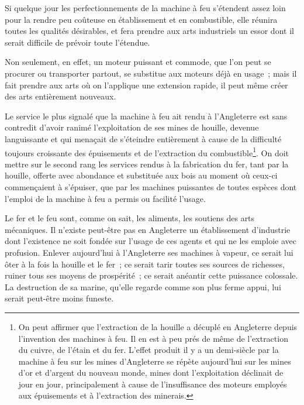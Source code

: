 \documentclass[french,twoside]{book} %
\begin{document}
Si quelque jour les perfectionnements de la machine à feu s’étendent assez loin pour la rendre peu coûteuse en établissement et en combustible, elle réunira toutes les qualités désirables, et fera prendre aux arts industriels un essor dont il serait difficile de prévoir toute l’étendue.\par
Non seulement, en effet, un moteur puissant et commode, que l’on peut se procurer ou transporter partout, se substitue aux moteurs déjà en usage ; mais il fait prendre aux arts où on l’applique une extension rapide, il peut même créer des arts entièrement nouveaux.\par
Le service le plus signalé que la machine à feu ait rendu à l’Angleterre est sans contredit d’avoir ranimé l’exploitation de ses mines de houille, devenue languissante et qui menaçait de s’éteindre entièrement à cause de la difficulté toujours croissante des épuisements et de l’extraction du combustible\footnote{On peut affirmer que l’extraction de la houille a décuplé en Angleterre depuis l’invention des machines à feu. Il en est à peu prés de même de l’extraction du cuivre, de l’étain et du fer. L’effet produit il y a un demi-siècle par la machine à feu sur les mines d’Angleterre se répète aujourd’hui sur les mines d’or et d’argent du nouveau monde, mines dont l’exploitation déclinait de jour en jour, principalement à cause de l’insuffisance des moteurs employés aux épuisements et à l’extraction des minerais.}. On doit mettre sur le second rang les services rendus à la fabrication du fer, tant par la houille, offerte avec abondance et substituée aux bois au moment où ceux-ci commençaient à s’épuiser, que par les machines puissantes de toutes espèces dont l’emploi de la machine à feu a permis ou facilité l’usage.\par
Le fer et le feu sont, comme on sait, les aliments, les soutiens des arts mécaniques. Il n’existe peut-être pas en Angleterre un établissement d’industrie dont l’existence ne soit fondée sur l’usage de ces agents et qui ne les emploie avec profusion. Enlever aujourd’hui à l’Angleterre ses machines à vapeur, ce serait lui ôter à la fois la houille et le fer ; ce serait tarir toutes ses sources de richesses, ruiner tous ses moyens de prospérité ; ce serait anéantir cette puissance colossale. La destruction de sa marine, qu’elle regarde comme son plus ferme appui, lui serait peut-être moins funeste.\par
\end{document}
